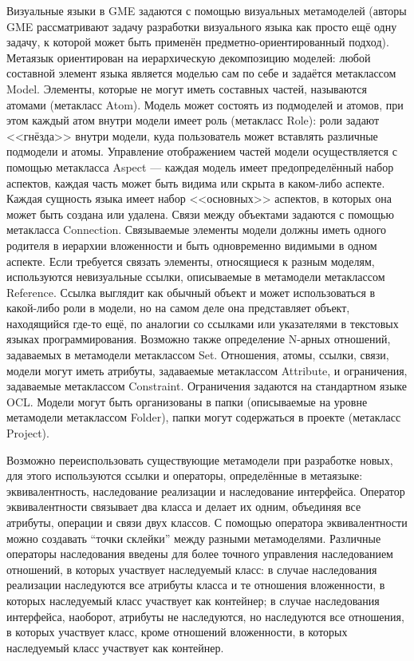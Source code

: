 Визуальные языки в GME задаются с помощью визуальных метамоделей (авторы GME рассматривают 
задачу разработки визуального языка как просто ещё одну задачу, к которой может быть 
применён предметно-ориентированный подход). Метаязык ориентирован на иерархическую 
декомпозицию моделей: любой составной элемент языка является моделью сам по себе и 
задаётся метаклассом Model. Элементы, которые не могут иметь составных частей, называются 
атомами (метакласс Atom). Модель может состоять из подмоделей и атомов, при этом каждый 
атом внутри модели имеет роль (метакласс Role): роли задают <<гнёзда>> внутри модели, 
куда пользователь может вставлять различные подмодели и атомы. Управление отображением 
частей модели осуществляется с помощью метакласса Aspect --- каждая модель имеет предопределённый 
набор аспектов, каждая часть может быть видима или скрыта в каком-либо аспекте. Каждая 
сущность языка имеет набор <<основных>> аспектов, в которых она может быть создана 
или удалена. Связи между объектами задаются с помощью метакласса Connection. Связываемые 
элементы модели должны иметь одного родителя в иерархии вложенности и быть одновременно 
видимыми в одном аспекте. Если требуется связать элементы, относящиеся к разным моделям, 
используются невизуальные ссылки, описываемые в метамодели метаклассом Reference. Ссылка 
выглядит как обычный объект и может использоваться в какой-либо роли в модели, но на 
самом деле она представляет объект, находящийся где-то ещё, по аналогии со ссылками 
или указателями в текстовых языках программирования. Возможно также определение N-арных 
отношений, задаваемых в метамодели метаклассом Set. Отношения, атомы, ссылки, связи, 
модели могут иметь атрибуты, задаваемые метаклассом Attribute, и ограничения, задаваемые 
метаклассом Constraint. Ограничения задаются на стандартном языке OCL. Модели могут 
быть организованы в папки (описываемые на уровне метамодели метаклассом Folder), папки 
могут содержаться в проекте (метакласс Project).

Возможно переиспользовать существующие метамодели при разработке новых, для этого 
используются ссылки и операторы, определённые в метаязыке: эквивалентность, наследование 
реализации и наследование интерфейса. Оператор эквивалентности связывает два класса 
и делает их одним, объединяя все атрибуты, операции и связи двух классов. С помощью 
оператора эквивалентности можно создавать “точки склейки” между разными метамоделями. 
Различные операторы наследования введены для более точного управления наследованием 
отношений, в которых участвует наследуемый класс: в случае наследования реализации 
наследуются все атрибуты класса и те отношения вложенности, в которых наследуемый 
класс участвует как контейнер; в случае наследования интерфейса, наоборот, атрибуты 
не наследуются, но наследуются все отношения, в которых участвует класс, кроме отношений 
вложенности, в которых наследуемый класс участвует как контейнер.

